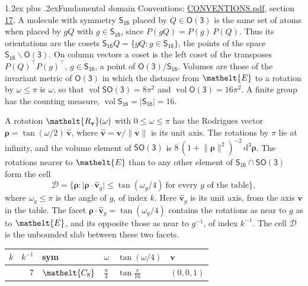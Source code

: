 \documentclass[10pt,a4paper]{article}
\makeatletter
\renewcommand\section{\@startsection{section}{1}{\z@}{-3ex plus -1ex minus -.2ex}%
  {1.2ex plus .2ex}{\normalfont\large\sffamily\bfseries\color{parttitle}}}
\numberwithin{equation}{section}
\newcommand{\eltfont}[1]{{\let\sigma\eltsigma\mathelt{#1}}}
\newcommand{\grp}[1]{\mathsf{#1}}
\newcommand{\cls}[1]{\eltfont{#1}}
\newcommand{\elt}[1]{\eltfont{#1}}
\newcommand{\dirvec}[3]{(#1, #2, #3)}
\newcommand{\unitaxis}{\hat{\mathbf{v}}}
\newcommand{\vv}{\mathbf{v}}
\newcommand{\diff}{\mathrm{d}}
\newcommand{\vol}{\operatorname{vol}}
\newcommand{\rodrigues}{\boldsymbol{\rho}}
\newcommand{\fcell}{\mathcal{D}}
\makeatother
\begin{document}
\section{Fundamental domain}\label{s:fundamental_domain}
Conventions: \href{../../CONVENTIONS.pdf}{CONVENTIONS.pdf}, section \href{../../CONVENTIONS.pdf\#conv.17}{17}.
\leavevmode\label{n:element.placement}A molecule with symmetry $\grp{S_{16}}$ placed by $Q \in \grp{O(3)}$ is the same set of atoms when placed by $gQ$ with $g \in \grp{S_{16}}$, since $P(gQ) = P(g)\,P(Q)$. \label{n:operator.cosets}Thus its orientations are the cosets $\grp{S_{16}}Q = \{gQ : g \in \grp{S_{16}}\}$, the points of the space $\grp{S_{16}}\backslash\grp{O(3)}$. On column vectors a coset is the left coset of the transposes $P(Q)^{\top}P(g)^{\top}$, $g \in \grp{S_{16}}$, a point of $\grp{O(3)}/\grp{S_{16}}$.
\leavevmode\label{n:operator.volume}Volumes are those of the invariant metric of \href{O3.pdf}{$\grp{O(3)}$} in which the distance from $\elt{E}$ to a rotation by $\omega \le \pi$ is $\omega$, so that $\vol\grp{SO(3)} = 8\pi^2$ and $\vol\grp{O(3)} = 16\pi^2$. A finite group has the counting measure, $\vol\grp{S_{16}} = |\grp{S_{16}}| = 16$.

\leavevmode\label{n:vector.rodrigues}\label{n:vector.unitaxis}A rotation $\elt{R_{\vv}}(\omega)$ with $0 \le \omega \le \pi$ has the Rodrigues vector $\rodrigues = \tan(\omega/2)\,\unitaxis$, where $\unitaxis = \vv/\lVert\vv\rVert$ is its unit axis. The rotations by $\pi$ lie at infinity, and the volume element of \href{SO3.pdf}{$\grp{SO(3)}$} is $8\,(1 + \lVert\rodrigues\rVert^2)^{-2}\,\diff^3\rodrigues$.
\leavevmode\label{n:set.cell}The rotations nearer to $\elt{E}$ than to any other element of $\grp{S_{16}} \cap \grp{SO(3)}$ form the cell
\begin{equation}\label{e:cell}\fcell = \bigl\{\rodrigues : \lvert\rodrigues\cdot\unitaxis_g\rvert \le \tan(\omega_g/4)\ \text{for every $g$ of the table}\bigr\},\end{equation}
where $\omega_g \le \pi$ is the angle of $g$, of index $k$. Here $\unitaxis_g$ is its unit axis, from the axis $\vv$ in the table. The facet $\rodrigues\cdot\unitaxis_g = \tan(\omega_g/4)$ contains the rotations as near to $g$ as to $\elt{E}$, and its opposite those as near to $g^{-1}$, of index $k^{-1}$. The cell $\fcell$ is the unbounded slab between these two facets.
{\small{\renewcommand{\arraystretch}{1.3}\begin{longtable}{@{}rrllll@{}}\toprule
$k$ & $k^{-1}$ & sym & $\omega$ & $\tan(\omega/4)$ & $\vv$\\\midrule\endhead
\bottomrule\endfoot\endlastfoot
1 & 7 & $\cls{C_{8}}$ & $\tfrac{\pi}{4}$ & $\tan\tfrac{\pi}{16}$ & $\dirvec{0}{0}{1}$\\
\bottomrule\end{longtable}}}
\end{document}
